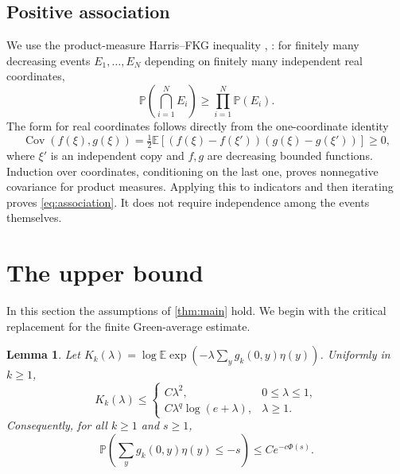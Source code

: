 \documentclass[11pt]{amsart}
\newtheorem{lemma}[theorem]{Lemma}
\theoremstyle{remark}
\newcommand{\Pp}{\mathbb P}
\newcommand{\E}{\mathbb E}
\begin{document}
\subsection{Positive association}
We use the product-measure Harris--FKG inequality
\cite{Harris}, \cite[Proposition~1, p.~91]{FKG}: for finitely many
decreasing events $E_1,\ldots,E_N$
depending on finitely many independent real coordinates,
\begin{equation}\label{eq:association}
 \Pp\left(\bigcap_{i=1}^N E_i\right)\ge\prod_{i=1}^N\Pp(E_i).
\end{equation}
The form for real coordinates follows directly from the one-coordinate
identity
\[
 \operatorname{Cov}(f(\xi),g(\xi))
 =\tfrac12\E[(f(\xi)-f(\xi'))(g(\xi)-g(\xi'))]\ge0,
\]
where $\xi'$ is an independent copy and $f,g$ are decreasing bounded
functions. Induction over coordinates, conditioning on the last one,
proves nonnegative covariance for product measures. Applying this to
indicators and then iterating proves \eqref{eq:association}.
It does not require independence among the events themselves.

\section{The upper bound}

In this section the assumptions of \cref{thm:main} hold.
We begin with the critical replacement for the finite Green-average
estimate.

\begin{lemma}\label{lem:laplace}
Let $K_k(\lambda)=\log\E\exp(-\lambda\sum_y g_k(0,y)\eta(y))$.
Uniformly in $k\ge1$,
\begin{equation}\label{eq:laplace}
 K_k(\lambda)\le
 \begin{cases}
 C\lambda^2,&0\le\lambda\le1,\\
 C\lambda^q\log(e+\lambda),&\lambda\ge1.
 \end{cases}
\end{equation}
Consequently, for all $k\ge1$ and $s\ge1$,
\begin{equation}\label{eq:greenprob}
 \Pp\left(\sum_y g_k(0,y)\eta(y)\le-s\right)
 \le Ce^{-c\Phi(s)}.
\end{equation}
\end{lemma}
\end{document}
